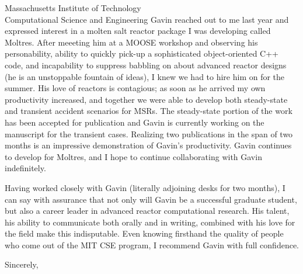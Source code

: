 \documentclass[12pt]{letter}
\begin{document}
\begin{letter}{Massachusetts Institute of Technology \\ Computational Science and Engineering}
Gavin reached out to me last year and expressed interest in a molten salt
reactor package I was developing called Moltres. After meeeting him at a MOOSE
workshop and observing his personability, ability to quickly pick-up a
sophisticated object-oriented C++ code, and incapability to suppress babbling on
about advanced reactor designs (he is an unstoppable fountain of ideas), I knew
we had to hire him on for the summer. His love of reactors is contagious; as
soon as he arrived my own productivity increased, and together we were able to
develop both steady-state and transient accident scenarios for MSRs. The
steady-state portion of the work has been accepted for publication and Gavin is
currently working on the manuscript for the transient cases. Realizing two
publications in the span of two months is an impressive demonstration of Gavin's
productivity. Gavin continues to develop for Moltres, and I hope to continue
collaborating with Gavin indefinitely.

Having worked closely with Gavin (literally adjoining desks for two months), I
can say with assurance that not only will Gavin be a successful
graduate student, but also a career leader in advanced reactor computational
research. His talent, his ability to communicate both orally and in writing,
combined with his love for the field make this indisputable. Even knowing
firsthand the quality of people who come out of the MIT CSE program, I recommend
Gavin with full confidence.

\closing{Sincerely,}
\end{letter}
\end{document}
